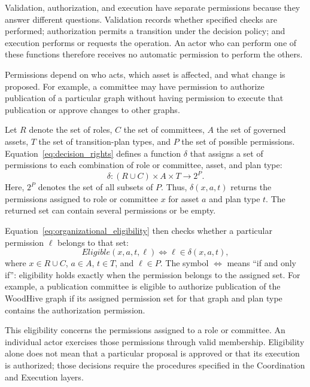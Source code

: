 \documentclass[journal]{IEEEtran}
\begin{document}
Validation, authorization, and execution have separate permissions
because they answer different questions. Validation records whether
specified checks are performed; authorization permits a transition
under the decision policy; and execution performs or requests the
operation. An actor who can perform one of these functions therefore
receives no automatic permission to perform the others.

Permissions depend on who acts, which asset is affected,
and what change is proposed. For example, a committee may
have permission to authorize publication of a particular
graph without having permission to execute that publication
or approve changes to other graphs.

Let $R$ denote the set of roles, $C$ the set of committees,
$A$ the set of governed assets, $T$ the set of transition-plan
types, and $P$ the set of possible permissions.
Equation~\ref{eq:decision_rights} defines a function $\delta$
that assigns a set of permissions to each combination of
role or committee, asset, and plan type:
\begin{equation}
\label{eq:decision_rights}
\delta:(R\cup C)\times A\times T\rightarrow 2^P.
\end{equation}
Here, $2^P$ denotes the set of all subsets of $P$.
Thus, $\delta(x,a,t)$ returns the permissions assigned to
role or committee $x$ for asset $a$ and plan type $t$.
The returned set can contain several permissions or be empty.

Equation~\ref{eq:organizational_eligibility} then checks
whether a particular permission $\ell$ belongs to that set:
\begin{equation}
\label{eq:organizational_eligibility}
Eligible(x,a,t,\ell)\iff \ell\in\delta(x,a,t),
\end{equation}
where $x\in R\cup C$, $a\in A$, $t\in T$, and $\ell\in P$.
The symbol $\iff$ means ``if and only if'': eligibility holds
exactly when the permission belongs to the assigned set.
For example, a publication committee is eligible to authorize
publication of the WoodHive graph if its assigned permission
set for that graph and plan type contains the authorization
permission.

This eligibility concerns the permissions assigned to a role
or committee. An individual actor exercises those permissions
through valid membership. Eligibility alone does not mean
that a particular proposal is approved or that its execution
is authorized; those decisions require the procedures
specified in the Coordination and Execution layers.
\end{document}
